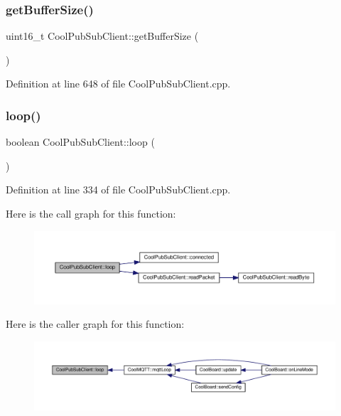 \subsubsection{\texorpdfstring{get\+Buffer\+Size()}{getBufferSize()}}
{\footnotesize\ttfamily uint16\+\_\+t Cool\+Pub\+Sub\+Client\+::get\+Buffer\+Size (\begin{DoxyParamCaption}{ }\end{DoxyParamCaption})}



Definition at line 648 of file Cool\+Pub\+Sub\+Client.\+cpp.

\mbox{\label{class_cool_pub_sub_client_afc15900f0fc4886a19394508e61793b8}} 
\subsubsection{\texorpdfstring{loop()}{loop()}}
{\footnotesize\ttfamily boolean Cool\+Pub\+Sub\+Client\+::loop (\begin{DoxyParamCaption}{ }\end{DoxyParamCaption})}



Definition at line 334 of file Cool\+Pub\+Sub\+Client.\+cpp.

Here is the call graph for this function\+:\nopagebreak
\begin{figure}[H]
\begin{center}
\leavevmode
\includegraphics[width=350pt]{class_cool_pub_sub_client_afc15900f0fc4886a19394508e61793b8_cgraph}
\end{center}
\end{figure}
Here is the caller graph for this function\+:\nopagebreak
\begin{figure}[H]
\begin{center}
\leavevmode
\includegraphics[width=350pt]{class_cool_pub_sub_client_afc15900f0fc4886a19394508e61793b8_icgraph}
\end{center}
\end{figure}
\mbox{\label{class_cool_pub_sub_client_ab6ad5fa2d3db8f91454027257f225a89}} 
